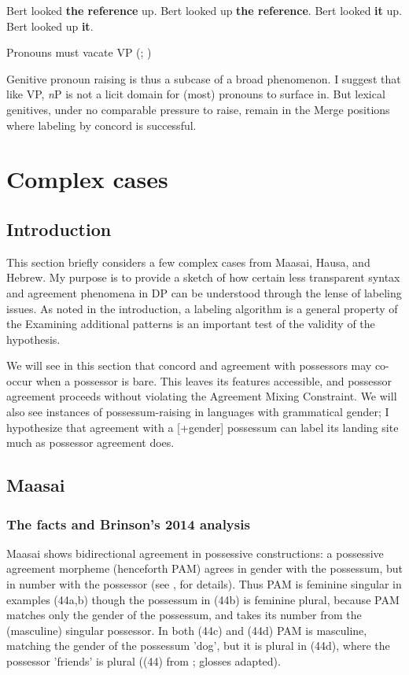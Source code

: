 \documentclass[output=paper
,modfonts
,nonflat]{langsci/langscibook}
\begin{document}
\begin{exe}
\ex \xlist
\ex Bert looked \textbf{the reference} up.
\ex Bert looked up \textbf{the reference}.
\ex Bert looked \textbf{it} up.
\ex *Bert looked up \textbf{it}.
\endxlist
\end{exe}
\begin{exe} 
\ex Pronouns must vacate VP (\citealt{Diesing1992, Diesing1997}; \citealt{Diesing_Jelinek1995})
\end{exe}
Genitive pronoun raising is thus a subcase of a broad phenomenon. I suggest that like VP, \textit{n}P is not a licit domain for (most) pronouns to surface in. But lexical genitives, under no comparable pressure to raise, remain in the Merge positions where labeling by concord is successful. 

\section{Complex cases}
\subsection{Introduction}

This section briefly considers a few complex cases from Maasai, Hausa, and Hebrew. My purpose is to provide a sketch of how certain less transparent syntax and agreement phenomena in DP can be understood through the lense of labeling issues. As noted in the introduction, a labeling algorithm is a general property of the Examining additional patterns is an important test of the validity of the hypothesis.

We will see in this section that concord and agreement with possessors may co-occur when a possessor is bare. This leaves its features accessible, and possessor agreement proceeds without violating the Agreement Mixing Constraint. We will also see instances of possessum-raising in languages with grammatical gender; I hypothesize that agreement with a [+gender] possessum can label its landing site much as possessor agreement does.

\subsection{Maasai}
\subsubsection{The facts and Brinson's 2014 analysis}
Maasai shows bidirectional agreement in possessive constructions: a possessive agreement morpheme (henceforth PAM) agrees in gender with the possessum, but in number with the possessor (see \citealt{Storto2003}, \citealt{Brinson2014} for details). Thus PAM is feminine singular in examples (44a,b) though the possessum in (44b) is feminine plural, because PAM matches only the gender of the possessum, and takes its number from the (masculine) singular possessor. In both (44c) and (44d) PAM  is masculine, matching the gender of the possessum 'dog', but it is plural in (44d), where the possessor 'friends' is plural ((44) from \citealt{Brinson2014}; glosses adapted).
\end{document}
